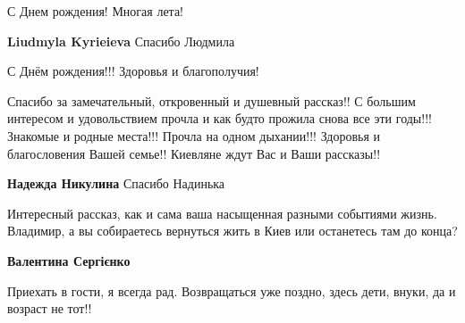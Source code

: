 С Днем рождения!
Многая лета!

\textbf{Liudmyla Kyrieieva} Спасибо Людмила

С Днём рождения!!! Здоровья и благополучия!


Спасибо за замечательный, откровенный и душевный рассказ!! С большим интересом и
удовольствием прочла и как будто прожила снова все эти годы!!! Знакомые и
родные места!!! Прочла на одном дыхании!!! Здоровья и благословения Вашей
семье!! Киевляне ждут Вас и Ваши рассказы!!

\textbf{Надежда Никулина} Спасибо Надинька


Интересный рассказ, как и сама ваша насыщенная разными событиями жизнь.
Владимир, а вы собираетесь вернуться жить в Киев или останетесь там до конца?

\textbf{Валентина Сергієнко} 

Приехать в гости, я всегда рад. Возвращаться уже поздно, здесь дети, внуки, да
и возраст не тот!!
